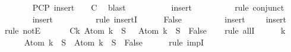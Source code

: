 \begin{isabellebody}
\ \ \ \ \ \ \isamarkupfalse%
\ PCP\ {\isacartoucheopen}{\isacharparenleft}insert\ {\isasymbottom}\ {\isacharbraceleft}{\isacharbraceright}{\isacharparenright}\ {\isasymin}\ C{\isacartoucheclose}\ \isamarkupfalse%
\ blast\ \isanewline
\ \ \ \ \isamarkupfalse%
\ \isamarkupfalse%
\ {\isachardoublequoteopen}{\isasymbottom}\ {\isasymnotin}\ {\isacharparenleft}insert\ {\isasymbottom}\ {\isacharbraceleft}{\isacharbraceright}{\isacharparenright}{\isachardoublequoteclose}\isanewline
\ \ \ \ \ \ \isamarkupfalse%
\ {\isacharparenleft}rule\ conjunct{}{\isacharparenright}\isanewline
\ \ \ \ \isamarkupfalse%
\ {\isachardoublequoteopen}{\isasymbottom}\ {\isasymin}\ {\isacharparenleft}insert\ {\isasymbottom}\ {\isacharbraceleft}{\isacharbraceright}{\isacharparenright}{\isachardoublequoteclose}\isanewline
\ \ \ \ \ \ \isamarkupfalse%
\ {\isacharparenleft}rule\ insertI{}{\isacharparenright}\isanewline
\ \ \ \ \isamarkupfalse%
\ {\isachardoublequoteopen}False{\isachardoublequoteclose}\isanewline
\ \ \ \ \ \ \isamarkupfalse%
\ {\isacartoucheopen}{\isasymbottom}\ {\isasymnotin}\ {\isacharparenleft}insert\ {\isasymbottom}\ {\isacharbraceleft}{\isacharbraceright}{\isacharparenright}{\isacartoucheclose}\ {\isacartoucheopen}{\isasymbottom}\ {\isasymin}\ {\isacharparenleft}insert\ {\isasymbottom}\ {\isacharbraceleft}{\isacharbraceright}{\isacharparenright}{\isacartoucheclose}\ \isamarkupfalse%
\ {\isacharparenleft}rule\ notE{\isacharparenright}\isanewline
\ \ \isamarkupfalse%
\isanewline
\ \ \isamarkupfalse%
\ C{}{\isacharcolon}{\isachardoublequoteopen}{\isasymforall}k{\isachardot}\ Atom\ k\ {\isasymin}\ S\ {\isasymlongrightarrow}\ \isactrlbold {\isasymnot}\ {\isacharparenleft}Atom\ k{\isacharparenright}\ {\isasymin}\ S\ {\isasymlongrightarrow}\ False{\isachardoublequoteclose}\isanewline
\ \ \isamarkupfalse%
\ {\isacharparenleft}rule\ allI{\isacharparenright}\isanewline
\ \ \ \ \isamarkupfalse%
\ k\isanewline
\ \ \ \ \isamarkupfalse%
\ {\isachardoublequoteopen}Atom\ k\ {\isasymin}\ S\ {\isasymlongrightarrow}\ \isactrlbold {\isasymnot}{\isacharparenleft}Atom\ k{\isacharparenright}\ {\isasymin}\ S\ {\isasymlongrightarrow}\ False{\isachardoublequoteclose}\isanewline
\ \ \ \ \isamarkupfalse%
\ {\isacharparenleft}rule\ impI{\isacharparenright}{\isacharplus}\isanewline
\ \ \ \ \ \ \isamarkupfalse%

\end{isabellebody}
